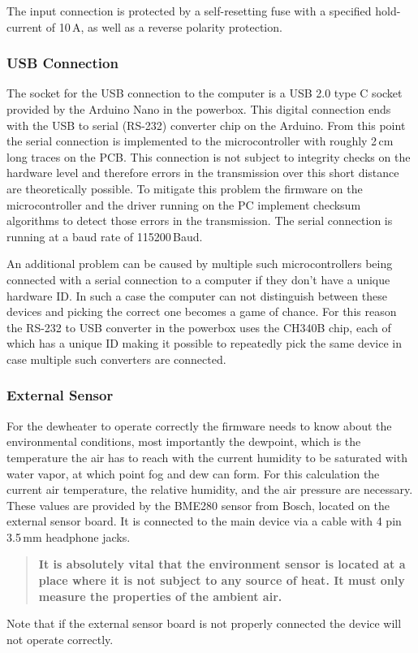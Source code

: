 \documentclass{scrartcl}
\begin{document}
The input connection is protected by a self-resetting fuse with a specified
hold-current of 10\,A, as well as a reverse polarity protection.

\subsubsection{USB Connection}
The socket for the USB connection to the computer is a USB 2.0 type C socket
provided by the Arduino Nano in the powerbox. This digital connection ends with
the USB to serial (RS-232) converter chip on the Arduino. From this point the
serial connection is implemented to the microcontroller with roughly 2\,cm long
traces on the PCB. This connection is not subject to integrity checks on the
hardware level and therefore errors in the transmission over this short distance
are theoretically possible. To mitigate this problem the firmware on the
microcontroller and the driver running on the PC implement checksum algorithms
to detect those errors in the transmission. The serial connection is running at
a baud rate of 115200\,Baud.

An additional problem can be caused by multiple such microcontrollers being
connected with a serial connection to a computer if they don't have a unique
hardware ID. In such a case the computer can not distinguish between these
devices and picking the correct one becomes a game of chance. For this reason
the RS-232 to USB converter in the powerbox uses the CH340B chip, each of which
has a unique ID making it possible to repeatedly pick the same device in case
multiple such converters are connected.

\subsubsection{External Sensor}
For the dewheater to operate correctly the firmware needs to know about the
environmental conditions, most importantly the dewpoint, which is the
temperature the air has to reach with the current humidity to be saturated with
water vapor, at which point fog and dew can form. For this calculation the
current air temperature, the relative humidity, and the air pressure are
necessary. These values are provided by the BME280 sensor from Bosch, located on
the external sensor board. It is connected to the main device via a cable with 4
pin 3.5\,mm headphone jacks.
\begin{quote}
\textbf{
  It is absolutely vital that the environment sensor is located at a place where
  it is not subject to any source of heat. It must only measure the properties
  of the ambient air.
}
\end{quote}
Note that if the external sensor board is not properly connected the device
will not operate correctly.
\end{document}
